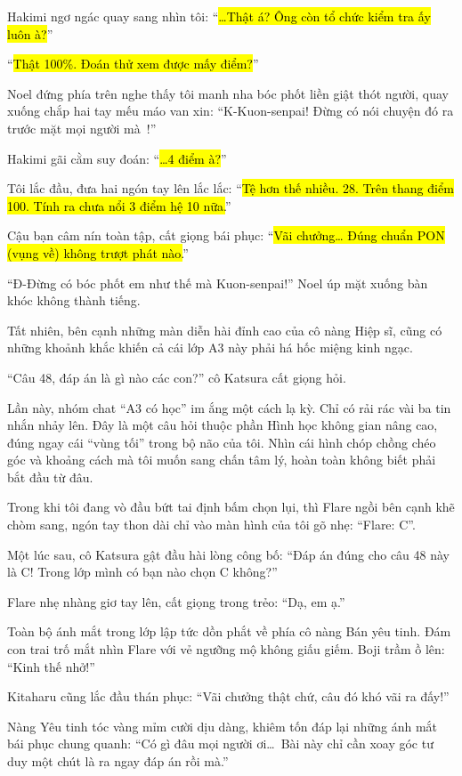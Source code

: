 \documentclass[../main.tex]{subfiles}
\begin{document}
Hakimi ngơ ngác quay sang nhìn tôi: ``\hl{\dots Thật á? Ông còn tổ chức kiểm tra ấy luôn à?}''

``\hl{Thật 100\%. Đoán thử xem được mấy điểm?}''

Noel đứng phía trên nghe thấy tôi manh nha bóc phốt liền giật thót người, quay xuống chắp hai tay mếu máo van xin: ``K-Kuon-senpai! Đừng có nói chuyện đó ra trước mặt mọi người mà~!''

Hakimi gãi cằm suy đoán: ``\hl{\dots 4 điểm à?}''

Tôi lắc đầu, đưa hai ngón tay lên lắc lắc: ``\hl{Tệ hơn thế nhiều. 28. Trên thang điểm 100. Tính ra chưa nổi 3 điểm hệ 10 nữa.}''

Cậu bạn câm nín toàn tập, cất giọng bái phục: ``\hl{Vãi chưởng\dots{} Đúng chuẩn PON (vụng về) không trượt phát nào.}''

``Đ-Đừng có bóc phốt em như thế mà Kuon-senpai!'' Noel úp mặt xuống bàn khóc không thành tiếng.

Tất nhiên, bên cạnh những màn diễn hài đỉnh cao của cô nàng Hiệp sĩ, cũng có những khoảnh khắc khiến cả cái lớp A3 này phải há hốc miệng kinh ngạc.

``Câu 48, đáp án là gì nào các con?'' cô Katsura cất giọng hỏi.

Lần này, nhóm chat ``A3 có học'' im ắng một cách lạ kỳ. Chỉ có rải rác vài ba tin nhắn nhảy lên. Đây là một câu hỏi thuộc phần Hình học không gian nâng cao, đúng ngay cái ``vùng tối'' trong bộ não của tôi. Nhìn cái hình chóp chồng chéo góc và khoảng cách mà tôi muốn sang chấn tâm lý, hoàn toàn không biết phải bắt đầu từ đâu.

Trong khi tôi đang vò đầu bứt tai định bấm chọn lụi, thì Flare ngồi bên cạnh khẽ chòm sang, ngón tay thon dài chỉ vào màn hình của tôi gõ nhẹ: ``Flare: C''.

Một lúc sau, cô Katsura gật đầu hài lòng công bố: ``Đáp án đúng cho câu 48 này là C! Trong lớp mình có bạn nào chọn C không?''

Flare nhẹ nhàng giơ tay lên, cất giọng trong trẻo: ``Dạ, em ạ.''

Toàn bộ ánh mắt trong lớp lập tức dồn phắt về phía cô nàng Bán yêu tinh. Đám con trai trố mắt nhìn Flare với vẻ ngưỡng mộ không giấu giếm. Boji trầm ồ lên: ``Kinh thế nhở!''

Kitaharu cũng lắc đầu thán phục: ``Vãi chưởng thật chứ, câu đó khó vãi ra đấy!''

Nàng Yêu tinh tóc vàng mỉm cười dịu dàng, khiêm tốn đáp lại những ánh mắt bái phục chung quanh: ``Có gì đâu mọi người ơi\dots\ Bài này chỉ cần xoay góc tư duy một chút là ra ngay đáp án rồi mà.''
\end{document}
